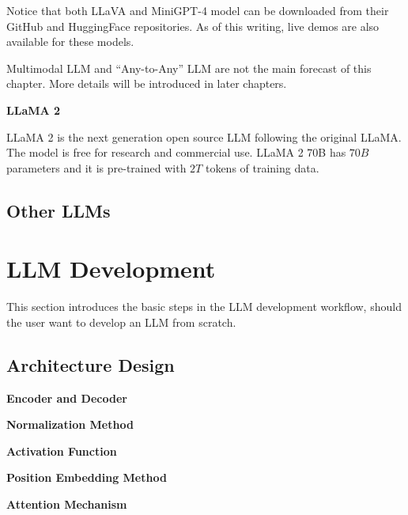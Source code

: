 Notice that both LLaVA and MiniGPT-4 model can be downloaded from their GitHub and HuggingFace repositories. As of this writing, live demos are also available for these models.

Multimodal LLM and ``Any-to-Any'' LLM are not the main forecast of this chapter. More details will be introduced in later chapters.

\vspace{0.1in}
\noindent \textbf{LLaMA 2}
\vspace{0.1in}

LLaMA 2 is the next generation open source LLM following the original LLaMA. The model is free for research and commercial use. LLaMA 2 70B has $70B$ parameters and it is pre-trained with $2T$ tokens of training data.

\subsection{Other LLMs}

\section{LLM Development}

This section introduces the basic steps in the LLM development workflow, should the user want to develop an LLM from scratch.

\subsection{Architecture Design}

\vspace{0.1in}
\noindent \textbf{Encoder and Decoder}
\vspace{0.1in}

\vspace{0.1in}
\noindent \textbf{Normalization Method}
\vspace{0.1in}

\vspace{0.1in}
\noindent \textbf{Activation Function}
\vspace{0.1in}

\vspace{0.1in}
\noindent \textbf{Position Embedding Method}
\vspace{0.1in}

\vspace{0.1in}
\noindent \textbf{Attention Mechanism}
\vspace{0.1in}

